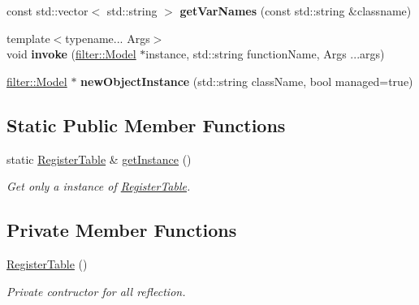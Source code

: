 \begin{DoxyCompactItemize}
const std\+::vector$<$ std\+::string $>$ {\bfseries get\+Var\+Names} (const std\+::string \&classname)
\item 
\mbox{\label{class_register_table_ad19b200bef00e5a5ccb09839a77295af}} 
{\footnotesize template$<$typename... Args$>$ }\\void {\bfseries invoke} (\hyperlink{classfilter_1_1_model}{filter\+::\+Model} $\ast$instance, std\+::string function\+Name, Args ...args)
\item 
\mbox{\label{class_register_table_ade2e6beefef750dda04455d10edca736}} 
\hyperlink{classfilter_1_1_model}{filter\+::\+Model} $\ast$ {\bfseries new\+Object\+Instance} (std\+::string class\+Name, bool managed=true)
\end{DoxyCompactItemize}
\subsection*{Static Public Member Functions}
\begin{DoxyCompactItemize}
\item 
static \hyperlink{class_register_table}{Register\+Table} \& \hyperlink{class_register_table_af0310faf8313bd789fdbe1fb7e2eaa52}{get\+Instance} ()
\begin{DoxyCompactList}\small\item\em Get only a instance of \hyperlink{class_register_table}{Register\+Table}. \end{DoxyCompactList}\end{DoxyCompactItemize}
\subsection*{Private Member Functions}
\begin{DoxyCompactItemize}
\item 
\mbox{\label{class_register_table_a99f80852e4df846119b80cc47941ae9d}} 
\hyperlink{class_register_table_a99f80852e4df846119b80cc47941ae9d}{Register\+Table} ()
\begin{DoxyCompactList}\small\item\em Private contructor for all reflection. \end{DoxyCompactList}\end{DoxyCompactItemize}

